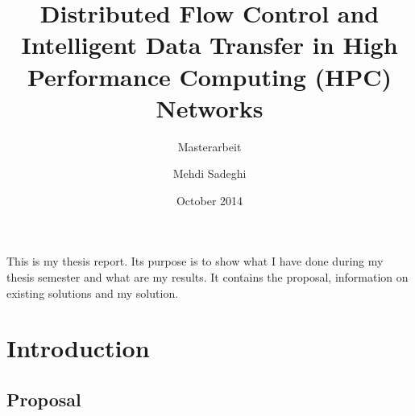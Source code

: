 \documentclass[oneside]{scrbook}
\begin{document}
\nocite{*}

\title{Distributed Flow Control and Intelligent Data Transfer in High Performance Computing (HPC) Networks}
\subtitle{Masterarbeit}
\author{Mehdi Sadeghi}

\publishers{University of Applied Sciences Offenburg\\
Graduate School}
\date{October 2014}

\maketitle
\frontmatter
\tableofcontents
\listoftables
\listoffigures


This is my thesis report. Its purpose is to show what I have done during my thesis semester and what are my results. It contains the proposal,
information on existing solutions and my solution.

\section{Introduction}
\subsection{Proposal}





\appendix

\end{document}
